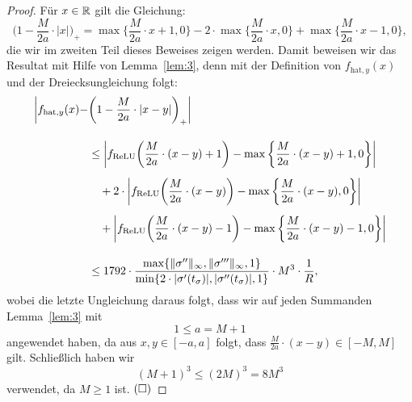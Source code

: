  \begin{proof}
  Für $x \in \mathbb{R}$ gilt die Gleichung:
\begin{equation}
\label{lem:4:eq}
 \bigg(1 - \frac{M}{2a} \cdot |x|\bigg)_+ = \max\bigg\{\frac{M}{2a} \cdot x + 1, 0\bigg\} - 2 \cdot \max\bigg\{\frac{M}{2a} \cdot x, 0\bigg\} + \max\bigg\{\frac{M}{2a} \cdot x - 1, 0\bigg\}, 
 \end{equation}  
die wir im zweiten Teil dieses Beweises zeigen werden. Damit beweisen wir das Resultat mit Hilfe von Lemma~\ref{lem:3}, denn mit der Definition von $f_{\mathrm{hat},y}(x)$ und der Dreiecksungleichung folgt:
\begin{equation*}
\begin{split}
\bigg|f_{\mathrm{hat},y}(x) - & \bigg(1 - \frac{M}{2a} \cdot |x - y|\bigg)_+\bigg| \\[1em]
& \leq \bigg|f_{\mathrm{ReLU}} \bigg(\frac{M}{2a} \cdot (x - y) + 1\bigg) - \max\bigg\{\frac{M}{2a} \cdot (x - y) + 1, 0\bigg\}\bigg| \\[0.5em]
& \quad + 2 \cdot \bigg|f_{\mathrm{ReLU}}\bigg(\frac{M}{2a} \cdot (x - y)\bigg) - \max\bigg\{\frac{M}{2a} \cdot (x - y), 0\bigg\}\bigg| \\[0.5em]
& \quad + \bigg|f_{\mathrm{ReLU}}\bigg(\frac{M}{2a} \cdot (x - y) - 1\bigg) - \max\bigg\{\frac{M}{2a} \cdot (x - y) - 1, 0\bigg\}\bigg|\\[1em] 
& \leq 1792 \cdot \frac{\max\{\|\sigma''\|_{\infty}, \|\sigma'''\|_{\infty}, 1\}}{\min\{2 \cdot |\sigma'(t_{\sigma})|, |\sigma''(t_{\sigma})|, 1\}} \cdot M^3 \cdot \frac{1}{R},
\end{split}
\end{equation*} 
wobei die letzte Ungleichung daraus folgt, dass wir auf jeden Summanden Lemma~\ref{lem:3} mit $$1 \leq a = M + 1$$ angewendet haben, da aus $x , y \in [-a, a]$ folgt, dass $\frac{M}{2a}\cdot (x - y) \in [-M, M]$ gilt. Schließlich haben wir
$$ (M + 1)^3 \leq (2M)^3 = 8M^3$$ verwendet, da $M \geq 1$ ist. $\hfill(\square)$


\end{proof}
